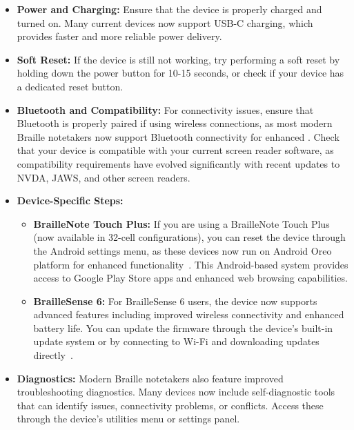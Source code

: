 \begin{itemize}
	\item \textbf{Power and Charging:} Ensure that the device is properly charged and turned on. Many current devices now support USB-C charging, which provides faster and more reliable power delivery.
	\item \textbf{Soft Reset:} If the device is still not working, try performing a soft reset by holding down the power button for 10-15 seconds, or check if your device has a dedicated reset button.
	\item \textbf{Bluetooth and Compatibility:} For connectivity issues, ensure that Bluetooth is properly paired if using wireless connections, as most modern Braille notetakers now support Bluetooth connectivity for enhanced . Check that your device is compatible with your current screen reader software, as compatibility requirements have evolved significantly with recent updates to NVDA, JAWS, and other screen readers.
	\item \textbf{Device-Specific Steps:}
	      \begin{itemize}
		      \item \textbf{BrailleNote Touch Plus:} If you are using a BrailleNote Touch Plus (now available in 32-cell configurations), you can reset the device through the Android settings menu, as these devices now run on Android Oreo platform for enhanced functionality~\supercite{BrailleNoteTouchPlus32}. This Android-based system provides access to Google Play Store apps and enhanced web browsing capabilities.
		      \item \textbf{BrailleSense 6:} For BrailleSense 6 users, the device now supports advanced features including improved wireless connectivity and enhanced battery life. You can update the firmware through the device's built-in update system or by connecting to Wi-Fi and downloading updates directly~\supercite{BrailleSense6}.
	      \end{itemize}
	\item \textbf{Diagnostics:} Modern Braille notetakers also feature improved troubleshooting diagnostics. Many devices now include self-diagnostic tools that can identify  issues, connectivity problems, or  conflicts. Access these through the device's utilities menu or settings panel.
\end{itemize}

